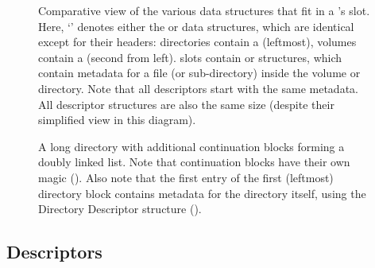 
\begin{figure}
 \centering

 \caption[CFT Directory Entry data structures]{\label{fig:entry-ds} Comparative
   view of the various data structures that fit in a 's
    slot. Here, ‘’ denotes either the
    or  data structures, which are identical except
   for their headers: directories contain a  (leftmost), volumes
   contain a  (second from left).  slots contain
    or  structures, which contain metadata for a file
   (or sub-directory) inside the volume or directory. Note that all descriptors
   start with the same metadata. All descriptor structures are also the same
   size (despite their simplified view in this diagram).}
\end{figure}


\begin{figure}
 \centering

 \caption[CFT Directory Linked List]{\label{fig:fs-directory-ll} A long
   directory with additional  continuation blocks forming a
   doubly linked list. Note that continuation blocks have their own
   magic (\magicDirectoryCont). Also note that the first entry of the first
   (leftmost) directory block contains metadata for the directory itself, using
   the Directory Descriptor structure (). }
\end{figure}

\subsection{Descriptors}

